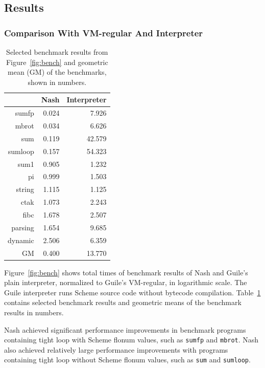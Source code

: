 \documentclass[preprint, 10pt]{sigplanconf}
\begin{document}
\subsection{Results}
\label{sec:results}

\subsubsection{Comparison With VM-regular And Interpreter}
\label{sec:guilecomp}

\begin{table}
  \centering
  \begin{tabular}{rrr}
     & Nash & Interpreter \\
    \toprule
    sumfp & 0.024 & 7.926 \\
    mbrot & 0.034 & 6.626 \\
    sum & 0.119 & 42.579 \\
    sumloop & 0.157 & 54.323 \\
    \midrule
    sum1 & 0.905 & 1.232 \\
    pi & 0.999 & 1.503 \\
    string & 1.115 & 1.125 \\
    \midrule
    ctak & 1.073 & 2.243 \\
    fibc & 1.678 & 2.507 \\
    parsing & 1.654 & 9.685 \\
    dynamic & 2.506 & 6.359 \\
    \midrule
    GM & 0.400 & 13.770 \\
  \end{tabular}
  \caption{Selected benchmark results from
    Figure~\hyperref[fig:bench]{\ref{fig:bench}} and geometric mean (GM) of
    the benchmarks, shown in numbers.}
\label{tab:compguile}
\end{table}

Figure~\ref{fig:bench} shows total times of benchmark results of Nash and
Guile's plain interpreter, normalized to Guile's VM-regular, in logarithmic
scale.  The Guile interpreter runs Scheme source code without bytecode
compilation.  Table~\hyperref[tab:compguile]{\ref{tab:compguile}} contains
selected benchmark results and geometric means of the benchmark results in
numbers.

Nash achieved significant performance improvements in benchmark programs
containing tight loop with Scheme flonum values, such as \texttt{sumfp} and
\texttt{mbrot}.  Nash also achieved relatively large performance improvements
with programs containing tight loop without Scheme flonum values, such as
\texttt{sum} and \texttt{sumloop}.
\end{document}
